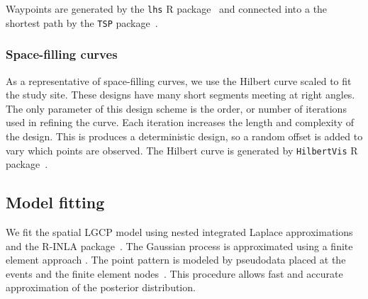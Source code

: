 \documentclass[review]{elsarticle}
\begin{document}
Waypoints are generated by the \texttt{lhs} R package~\cite{lhs}
and connected into a the shortest path by the \texttt{TSP} package~\citep{tsp}.


\subsubsection{Space-filling curves}

As a representative of space-filling curves, we use the Hilbert curve scaled
to fit the study site. These designs have many short segments meeting at right
angles. The only parameter of this design scheme is the order, or number of
iterations used in refining the curve. Each iteration increases the length and
complexity of the design. This is produces a deterministic design, so a random
offset is added to vary which points are observed. The Hilbert curve is
generated by \texttt{HilbertVis} R package~\citep{hilbertvis}.




\subsection{Model fitting}

We fit the spatial LGCP model using nested integrated Laplace approximations
and the R-INLA package~\citep{rueetal,rinla}. The Gaussian process is
approximated using a finite element approach \citep{lindgrenetal}. The point
pattern is modeled by pseudodata placed at the events and the finite element
nodes~\citep{simpsonetal}. This procedure allows fast and accurate
approximation of the posterior distribution.%
\end{document}
